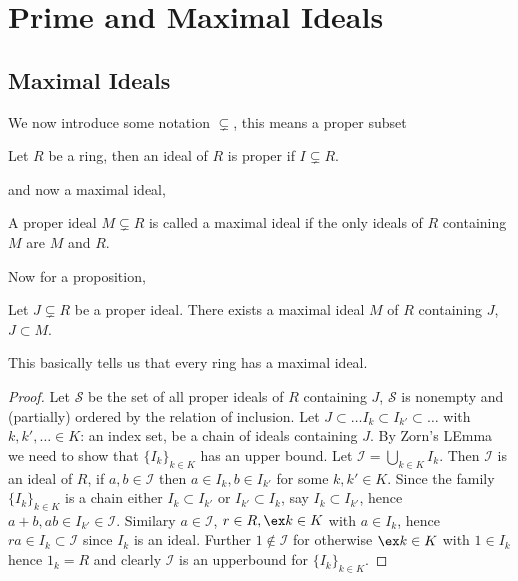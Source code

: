 \section{Prime and Maximal Ideals}

\subsection{Maximal Ideals}

\begin{notation}
  We now introduce some notation $\subsetneq$, this means a proper subset
\end{notation}

\begin{ndefi}
  Let $R$ be a ring, then an ideal of $R$ is proper if $I \subsetneq R$.
\end{ndefi}

and now a maximal ideal,
\begin{ndefi}
  A proper ideal $M \subsetneq R$ is called a maximal ideal if the only ideals of $R$ containing $M$ are $M$ and $R$.
\end{ndefi}

Now for a proposition,
\begin{nprop}
   Let $J \subsetneq R$ be a proper ideal. There exists a maximal ideal $M$ of $R$ containing $J$, $J \subset M$.
\end{nprop}

This basically tells us that every ring has a maximal ideal.

\begin{proof}
  Let $\mathcal{S}$ be the set of all proper ideals of $R$ containing $J$, $\mathcal{S}$ is nonempty and (partially) ordered by the relation of inclusion. Let $J \subset \dots I_k \subset I_{k'} \subset \dots$ with $k, k', \dots \in K$: an index set, be a chain of ideals containing $J$. By Zorn's LEmma we need to show that $\{I_k\}_{k \in K}$ has an upper bound. Let $\mathcal{I} = \bigcup_{k \in K} I_k$. Then $\mathcal{I}$ is an ideal of $R$, if $a, b \in \mathcal{I}$
  then $a \in I_k, b \in I_{k'}$ for some $k, k' \in K$. Since the family $\{I_k\}_{k \in K}$ is a chain either $I_k \subset I_{k'}$ or $I_{k'} \subset I_k$, say $I_k \subset I_{k'}$, hence $a+ b, ab \in I_{k'} \in \mathcal{I}$. Similary $a \in \mathcal{I}$, $r \in R, \ex k \in K$ with $a \in I_k$, hence $ra \in I_k \subset \mathcal{I}$ since $I_k$ is an ideal. Further $1 \notin \mathcal{I}$ for otherwise $\ex k \in K$ with $1 \in I_k$ hence $1_k = R$ and clearly $\mathcal{I}$ is an upperbound for $\{I_k\}_{k \in K}$.
\end{proof}


